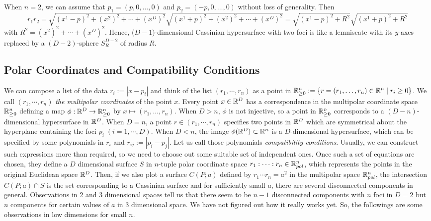 \documentclass{article}
\begin{document}
When $n=2$, we can assume that $p_1 = (p,0,\dots,0)$ and $p_2 = (-p,0,\dots,0)$ without loss of generality. Then
\begin{equation}
\label{ }
r_1r_2 = \sqrt{(x^1-p)^2 + (x^2)^2 + \cdots + (x^D)^2}\sqrt{(x^1+p)^2 + (x^2)^2 + \cdots + (x^D)^2} = \sqrt{(x^1-p)^2 + R^2}\sqrt{(x^1+p)^2 + R^2}
\end{equation}
with $R^2 = (x^2)^2 + \cdots + (x^D)^2$. Hence, ($D-1$)-dimensional Cassinian hypersurface with two foci is like a lemniscate with its $y$-axes replaced by a $(D-2)$-sphere $S_R^{D-2}$ of radius $R$.

\subsection{Polar Coordinates and Compatibility Conditions}
\label{sec-1-3}
We can compose a list of the data $r_i := |x-p_i|$ and think of the list $(r_1,\cdots,r_n)$ as a point in $\mathbb R^n_{\ge0}:= \left\{r=(r_{1},\dots,r_{n}) \in \mathbb R^{n}\mid r_{i}\ge0\right\}$. 
We call $(r_1,\cdots,r_n)$ \emph{the multipolar coordinates} of the point $x$. 
Every point $x \in \mathbb R^D$ has a correspondence in the multipolar coordinate space $\mathbb R^n_{\ge0}$ defining a map $\phi:\mathbb R^D \rightarrow \mathbb R^n_{\ge0}$ by $x \mapsto (r_{1},\dots,r_{n})$. 
When $D>n$, $\phi$ is not injective, so a point in $\mathbb R^n_{\ge0}$ corresponds to a $(D-n)$-dimensional hypersurface in $\mathbb R^{D}$. 
When $D=n$, a point $r \in (r_1, \cdots,r_n)$ specifies two points in $\mathbb R^D$ which are symmetrical about the hyperplane containing the foci $p_i \;(i=1,\cdots,D)$. 
When $D<n$, the image $\phi(\mathbb R^D) \subset \mathbb R^n$ is a $D$-dimensional hypersurface, which can be specified by some polynomials in $r_i$ and $r_{ij}:=|p_{i}-p_{j}|$. 
Let us call those polynomials \emph{compatibility conditions}. Usually, we can construct such expressions more than required, so we need to choose out some suitable set of independent ones. 
Once such a set of equations are chosen, they define a $D$ dimensional surface $S$ in $n$-tuple polar coordinate space $r_1:\cdots:r_n \in \mathbb R_{pol}^n$, which represents the points in the original Euclidean space $\mathbb R^D$. 
Then, if we also plot a surface $C(P;a)$ defined by $r_1\cdots r_n = a^2$ in the multipolar space $\mathbb R_{pol}^n$, the intersection $C(P;a) \cap S$ is the set corresponding to a Cassinian surface and for sufficiently small $a$, there are several disconnected components in general. 
Observations in 2 and 3 dimensional spaces tell us that there seem to be $n-1$ disconnected components with $n$ foci in $D=2$ but $n$ components for certain values of $a$ in 3 dimensional space. 
We have not figured out how it really works yet. So, the followings are some observations in low dimensions for small $n$.
\end{document}
